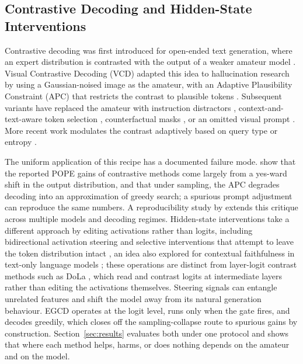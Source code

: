 \documentclass{ieeeaccess}
\begin{document}
\subsection{Contrastive Decoding and Hidden-State Interventions}\label{subsec:contrastive}

Contrastive decoding was first introduced for open-ended text generation, where an expert distribution is contrasted with the output of a weaker amateur model \cite{li2023acontrastive,su2022empirical}. Visual Contrastive Decoding (VCD) adapted this idea to hallucination research by using a Gaussian-noised image as the amateur, with an Adaptive Plausibility Constraint (APC) that restricts the contrast to plausible tokens \cite{leng2024mitigating}. Subsequent variants have replaced the amateur with instruction distractors \cite{wang2024mitigating}, context-and-text-aware token selection \cite{huo2025self}, counterfactual masks \cite{xiao2026macd}, or an omitted visual prompt \cite{favero2024multi}. More recent work modulates the contrast adaptively based on query type or entropy \cite{im2025selfaug,huang2026chasd}.

The uniform application of this recipe has a documented failure mode. \cite{yin2025mirage} show that the reported POPE gains of contrastive methods come largely from a yes-ward shift in the output distribution, and that under sampling, the APC degrades decoding into an approximation of greedy search; a spurious prompt adjustment can reproduce the same numbers. A reproducibility study by \cite{bendre2026rethinking} extends this critique across multiple models and decoding regimes. Hidden-state interventions take a different approach by editing activations rather than logits, including bidirectional activation steering \cite{su2025activation} and selective interventions that attempt to leave the token distribution intact \cite{zhang2026mitigating}, an idea also explored for contextual faithfulness in text-only language models \cite{wang2025contextfocus}; these operations are distinct from layer-logit contrast methods such as DoLa \cite{chuang2024dola}, which read and contrast logits at intermediate layers rather than editing the activations themselves. Steering signals can entangle unrelated features and shift the model away from its natural generation behaviour. EGCD operates at the logit level, runs only when the gate fires, and decodes greedily, which closes off the sampling-collapse route to spurious gains by construction. Section~\ref{sec:results} evaluates both under one protocol and shows that where each method helps, harms, or does nothing depends on the amateur and on the model.
\end{document}
